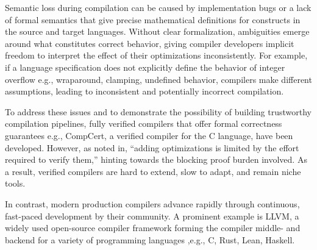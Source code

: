 \documentclass[review, anonymous, acmsmall, screen]{acmart}
\DeclareRobustCommand{\circled}[2][]{%
    \ifthenelse{\isempty{#1}}%
        {\circledbase{pairedOneLightBlue}{#2}}%
        {\autoref{#1}: \hyperref[#1]{\circledbase{pairedOneLightBlue}{#2}}}%
}
\begin{document}
Semantic loss during compilation can be caused by implementation bugs or a lack of formal semantics 
that give precise mathematical definitions for constructs in the source and target languages. 
Without clear formalization, ambiguities emerge around what constitutes correct behavior, giving 
compiler developers implicit freedom to interpret the effect of their optimizations inconsistently. 
For example, if a language specification does not explicitly define the behavior of integer overflow 
e.g., wraparound, clamping, undefined behavior, compilers make different assumptions, leading to inconsistent
and potentially incorrect compilation.

To address these issues and to demonstrate the possibility of building trustworthy compilation pipelines,
fully verified compilers that offer formal correctness guarantees e.g., CompCert, 
a verified compiler for the C language, have been developed. However, as noted in, “adding optimizations 
is limited by the effort required to verify them,” hinting towards the blocking
proof burden involved. As a result, verified compilers are hard to extend, slow to adapt, and remain
niche tools.

In contrast, modern production compilers advance rapidly through continuous, fast-paced development 
by their community. A prominent example is LLVM, a widely used open-source compiler 
framework forming the compiler middle- and backend for a variety of programming languages ,e.g., C, 
Rust, Lean, Haskell.
\end{document}
